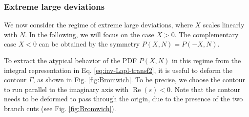 \documentclass[aps,pre,twocolumn,superscriptaddress,showpacs]{revtex4-1}
\begin{document}
\subsubsection{Extreme large deviations}

We now consider the regime of extreme large deviations, where $X$ scales linearly with $N$. In the following, we will focus on the case $X>0$. The complementary case $X<0$ can be obtained by the symmetry $P(X,N)=P(-X,N)$.

To extract the atypical behavior of the PDF $P(X,N)$ in this regime from the integral representation in Eq. \eqref{eq:inv-Lapl-transf2}, it is useful to deform the contour $\Gamma$, as shown in Fig. \ref{fig:Bromwich}. To be precise, we choose the contour to run  parallel to the imaginary axis with $\operatorname{Re}(s)<0$. Note that the contour needs to be deformed to pass through the origin, due to the presence of the two branch cuts (see Fig. \ref{fig:Bromwich}). 
\end{document}
